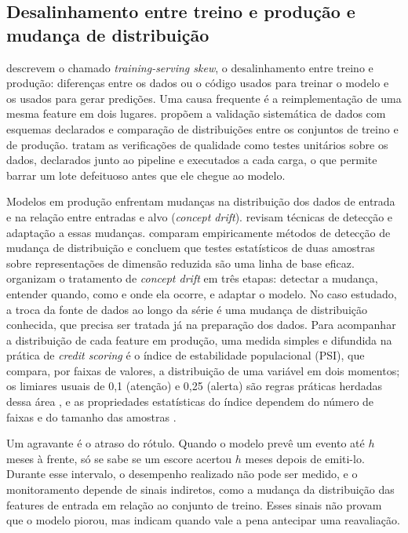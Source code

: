 \subsection{Desalinhamento entre treino e produção e mudança de distribuição}

 descrevem o chamado \textit{training-serving skew}, o desalinhamento entre treino e produção: diferenças entre os dados ou o código usados para treinar o modelo e os usados para gerar predições. Uma causa frequente é a reimplementação de uma mesma feature em dois lugares.  propõem a validação sistemática de dados com esquemas declarados e comparação de distribuições entre os conjuntos de treino e de produção.  tratam as verificações de qualidade como testes unitários sobre os dados, declarados junto ao pipeline e executados a cada carga, o que permite barrar um lote defeituoso antes que ele chegue ao modelo.


Modelos em produção enfrentam mudanças na distribuição dos dados de entrada e na relação entre entradas e alvo (\textit{concept drift}).  revisam técnicas de detecção e adaptação a essas mudanças.  comparam empiricamente métodos de detecção de mudança de distribuição e concluem que testes estatísticos de duas amostras sobre representações de dimensão reduzida são uma linha de base eficaz.  organizam o tratamento de \textit{concept drift} em três etapas: detectar a mudança, entender quando, como e onde ela ocorre, e adaptar o modelo. No caso estudado, a troca da fonte de dados ao longo da série é uma mudança de distribuição conhecida, que precisa ser tratada já na preparação dos dados. Para acompanhar a distribuição de cada feature em produção, uma medida simples e difundida na prática de \textit{credit scoring} é o índice de estabilidade populacional (PSI), que compara, por faixas de valores, a distribuição de uma variável em dois momentos; os limiares usuais de 0,1 (atenção) e 0,25 (alerta) são regras práticas herdadas dessa área \cite{siddiqi2006}, e as propriedades estatísticas do índice dependem do número de faixas e do tamanho das amostras \cite{yurdakul2018}.

Um agravante é o atraso do rótulo. Quando o modelo prevê um evento até $h$ meses à frente, só se sabe se um escore acertou $h$ meses depois de emiti-lo. Durante esse intervalo, o desempenho realizado não pode ser medido, e o monitoramento depende de sinais indiretos, como a mudança da distribuição das features de entrada em relação ao conjunto de treino. Esses sinais não provam que o modelo piorou, mas indicam quando vale a pena antecipar uma reavaliação.

